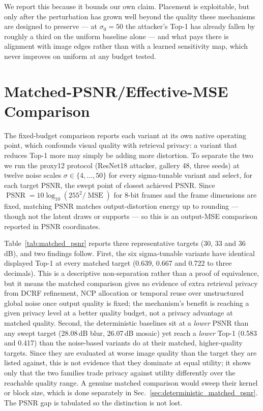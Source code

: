 \documentclass[10pt,journal]{IEEEtran}
\begin{document}
We report this because it bounds our own claim. Placement is exploitable, but
only after the perturbation has grown well beyond the quality these mechanisms
are designed to preserve --- at $\sigma_0=50$ the attacker's Top-1 has already
fallen by roughly a third on the uniform baseline alone --- and what pays
there is alignment with image edges rather than with a learned sensitivity
map, which never improves on uniform at any budget tested.


\section{Matched-PSNR/Effective-MSE Comparison}
\label{sec:matched_psnr}

The fixed-budget comparison reports each variant at its own native operating
point, which confounds visual quality with retrieval privacy: a variant that
reduces Top-1 more may simply be adding more distortion. To separate the two
we run the proxy12 protocol (ResNet18 attacker, gallery 48, three seeds) at
twelve noise scales $\sigma\in\{4,\dots,50\}$ for every sigma-tunable variant
and select, for each target PSNR, the swept point of closest achieved PSNR.
Since $\operatorname{PSNR}=10\log_{10}(255^2/\operatorname{MSE})$ for 8-bit
frames and the frame dimensions are fixed, matching PSNR matches
output-distortion energy up to rounding --- though not the latent draws or
supports --- so this is an output-MSE comparison reported in PSNR
coordinates.

Table~\ref{tab:matched_psnr} reports three representative targets (30, 33 and
36\,dB), and two findings follow. First, the six sigma-tunable variants have
identical displayed Top-1 at every matched target (0.639, 0.667 and 0.722 to
three decimals). This is a descriptive non-separation rather than a proof of
equivalence, but it means the matched comparison gives no evidence of extra
retrieval privacy from DCRF refinement, NCP allocation or temporal reuse over
unstructured global noise once output quality is fixed; the mechanism's
benefit is reaching a given privacy level at a better quality budget, not a
privacy advantage at matched quality. Second, the deterministic baselines sit
at a \emph{lower} PSNR than any swept target (28.08\,dB blur, 26.07\,dB
mosaic) yet reach a \emph{lower} Top-1 (0.583 and 0.417) than the noise-based
variants do at their matched, higher-quality targets. Since they are evaluated
at worse image quality than the target they are listed against, this is not
evidence that they dominate at equal utility; it shows only that the two
families trade privacy against utility differently over the reachable quality
range. A genuine matched comparison would sweep their kernel or block size,
which is done separately in Sec.~\ref{sec:deterministic_matched_psnr}. The
PSNR gap is tabulated so the distinction is not lost.
\end{document}
